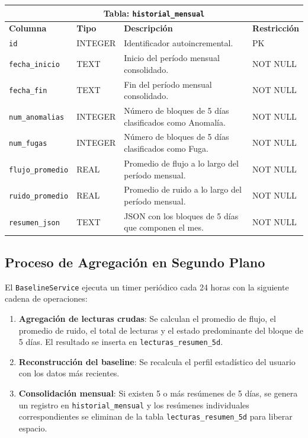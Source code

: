 \documentclass[12pt,a4paper]{article}
\begin{document}
\begin{center}
\begin{tabularx}{0.95\textwidth}{llXl}
    \toprule
    \multicolumn{4}{c}{\textbf{Tabla: \texttt{historial\_mensual}}} \\
    \midrule
    \textbf{Columna} & \textbf{Tipo} & \textbf{Descripción} & \textbf{Restricción} \\
    \midrule
    \texttt{id}              & INTEGER & Identificador autoincremental.                        & PK \\
    \texttt{fecha\_inicio}   & TEXT    & Inicio del período mensual consolidado.               & NOT NULL \\
    \texttt{fecha\_fin}      & TEXT    & Fin del período mensual consolidado.                  & NOT NULL \\
    \texttt{num\_anomalias}  & INTEGER & Número de bloques de 5 días clasificados como Anomalía. & NOT NULL \\
    \texttt{num\_fugas}      & INTEGER & Número de bloques de 5 días clasificados como Fuga.    & NOT NULL \\
    \texttt{flujo\_promedio} & REAL    & Promedio de flujo a lo largo del período mensual.     & NOT NULL \\
    \texttt{ruido\_promedio} & REAL    & Promedio de ruido a lo largo del período mensual.     & NOT NULL \\
    \texttt{resumen\_json}   & TEXT    & JSON con los bloques de 5 días que componen el mes.   & NOT NULL \\
    \bottomrule
\end{tabularx}
\end{center}

\subsection{Proceso de Agregación en Segundo Plano}

El \texttt{BaselineService} ejecuta un timer periódico cada 24 horas con la siguiente cadena de operaciones:

\begin{enumerate}[noitemsep]
    \item \textbf{Agregación de lecturas crudas}: Se calculan el promedio de flujo, el promedio de ruido, el total de lecturas y el estado predominante del bloque de 5 días. El resultado se inserta en \texttt{lecturas\_resumen\_5d}.
    \item \textbf{Reconstrucción del baseline}: Se recalcula el perfil estadístico del usuario con los datos más recientes.
    \item \textbf{Consolidación mensual}: Si existen 5 o más resúmenes de 5 días, se genera un registro en \texttt{historial\_mensual} y los resúmenes individuales correspondientes se eliminan de la tabla \texttt{lecturas\_resumen\_5d} para liberar espacio.
\end{enumerate}
\end{document}
